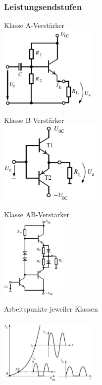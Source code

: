          \subsubsection{Leistungsendstufen}
             \begin{minipage}[T]{4.7cm}
                 Klasse A-Verstärker\\
                 \includegraphics[height=4cm]{./images/KlassA_Amp.png}
             \end{minipage}
             \begin{minipage}[T]{4.7cm}
                 Klasse B-Verst\"arker\\
                 \includegraphics[height=4cm]{./images/KlassB_Amp.png}
             \end{minipage}
             \begin{minipage}[T]{4.7cm}
                 Klasse AB-Verstärker\\
                 \includegraphics[height=4cm]{./images/KlassAB_Amp.png}
             \end{minipage}
             \begin{minipage}[T]{4.7cm}
                 Arbeitspunkte jeweiler Klassen\\\\
                 \vspace{5mm}
                 \includegraphics[width=4.7cm]{./images/EndstufenAP.png}
             \end{minipage}		